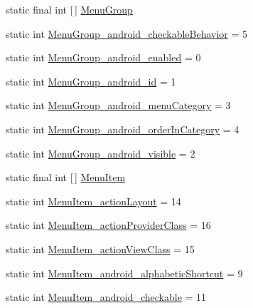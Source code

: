 \begin{DoxyCompactItemize}
static final int \mbox{[}$\,$\mbox{]} \hyperlink{classandroid_1_1support_1_1v7_1_1mediarouter_1_1R_1_1styleable_a0bae5cf4aace765b3bb99d32de6ce7ff}{Menu\+Group}
\item 
static int \hyperlink{classandroid_1_1support_1_1v7_1_1mediarouter_1_1R_1_1styleable_a7fc5c3225108078abc2996d8bedda93c}{Menu\+Group\+\_\+android\+\_\+checkable\+Behavior} = 5
\item 
static int \hyperlink{classandroid_1_1support_1_1v7_1_1mediarouter_1_1R_1_1styleable_a99b864f4e9d8c1343d9a229c4fafc1d8}{Menu\+Group\+\_\+android\+\_\+enabled} = 0
\item 
static int \hyperlink{classandroid_1_1support_1_1v7_1_1mediarouter_1_1R_1_1styleable_a29c4e10c0aeaf739d90a95589760567c}{Menu\+Group\+\_\+android\+\_\+id} = 1
\item 
static int \hyperlink{classandroid_1_1support_1_1v7_1_1mediarouter_1_1R_1_1styleable_aec7255225b161f1adf3fdde682b26d8c}{Menu\+Group\+\_\+android\+\_\+menu\+Category} = 3
\item 
static int \hyperlink{classandroid_1_1support_1_1v7_1_1mediarouter_1_1R_1_1styleable_a910908056e3ec8a81229d225d0bf0e5f}{Menu\+Group\+\_\+android\+\_\+order\+In\+Category} = 4
\item 
static int \hyperlink{classandroid_1_1support_1_1v7_1_1mediarouter_1_1R_1_1styleable_a3105b99a4ceb4bd3bba44b5de600fc44}{Menu\+Group\+\_\+android\+\_\+visible} = 2
\item 
static final int \mbox{[}$\,$\mbox{]} \hyperlink{classandroid_1_1support_1_1v7_1_1mediarouter_1_1R_1_1styleable_ab3f2d4af0d17a47efacf7fd82df9528d}{Menu\+Item}
\item 
static int \hyperlink{classandroid_1_1support_1_1v7_1_1mediarouter_1_1R_1_1styleable_a78482ce9b7b1a984cf7dcd025dda397f}{Menu\+Item\+\_\+action\+Layout} = 14
\item 
static int \hyperlink{classandroid_1_1support_1_1v7_1_1mediarouter_1_1R_1_1styleable_ae72dd8fd6d8d6b80d2966548a77910e2}{Menu\+Item\+\_\+action\+Provider\+Class} = 16
\item 
static int \hyperlink{classandroid_1_1support_1_1v7_1_1mediarouter_1_1R_1_1styleable_a545b5468a5f0d9703946118b0bd71bc3}{Menu\+Item\+\_\+action\+View\+Class} = 15
\item 
static int \hyperlink{classandroid_1_1support_1_1v7_1_1mediarouter_1_1R_1_1styleable_a8ac2af9738b8960cf827ec83b5170112}{Menu\+Item\+\_\+android\+\_\+alphabetic\+Shortcut} = 9
\item 
static int \hyperlink{classandroid_1_1support_1_1v7_1_1mediarouter_1_1R_1_1styleable_a9589fc6eccc92b23929e6514ff607f33}{Menu\+Item\+\_\+android\+\_\+checkable} = 11

\end{DoxyCompactItemize}
